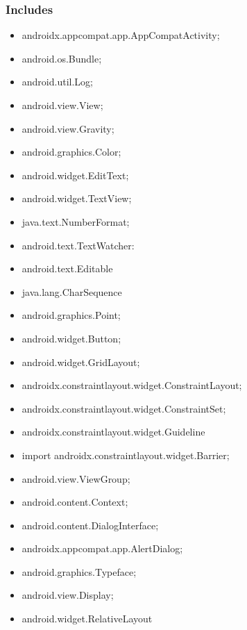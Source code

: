 \documentclass{report}
\begin{document}
    \subsubsection{Includes}
    \begin{itemize}
        \item androidx.appcompat.app.AppCompatActivity;
        \item android.os.Bundle;
        \item android.util.Log;
        \item android.view.View;
        \item android.view.Gravity;
        \item android.graphics.Color;
        \item android.widget.EditText;
        \item android.widget.TextView;
        \item java.text.NumberFormat;
        \item android.text.TextWatcher: 
        \item android.text.Editable
        \item java.lang.CharSequence
        \item android.graphics.Point;
        \item android.widget.Button;
        \item android.widget.GridLayout;
        \item androidx.constraintlayout.widget.ConstraintLayout;
        \item androidx.constraintlayout.widget.ConstraintSet;
        \item androidx.constraintlayout.widget.Guideline
        \item import androidx.constraintlayout.widget.Barrier;
        \item android.view.ViewGroup;
        \item android.content.Context;
        \item android.content.DialogInterface;
        \item androidx.appcompat.app.AlertDialog;
        \item android.graphics.Typeface;
        \item android.view.Display;
        \item android.widget.RelativeLayout
    \end{itemize}

    \pagebreak 
\end{document}
